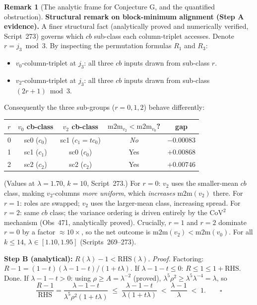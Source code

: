 \documentclass[11pt]{article}
\theoremstyle{definition}
\newtheorem{remark}[theorem]{Remark}
\begin{document}
\begin{remark}[The analytic frame for Conjecture G, and the quantified
obstruction]
\textbf{Structural remark on block-minimum alignment (Step A evidence).}
A finer structural fact (analytically proved and numerically verified, Script~273)
governs which $cb$ sub-class each column-triplet accesses.
Denote $r = j_3 \bmod 3$. By inspecting the permutation formulas $R_1$ and $R_3$:
\begin{itemize}
  \item $v_0$-column-triplet at $j_3$: all three $cb$ inputs drawn from sub-class $r$.
  \item $v_2$-column-triplet at $j_3$: all three $cb$ inputs drawn from sub-class $(2r+1)\!\bmod 3$.
\end{itemize}
Consequently the three sub-groups ($r=0,1,2$) behave differently:
\begin{center}
\begin{tabular}{ccccc}
$r$ & $v_0$ cb-class & $v_2$ cb-class & $\mathrm{m2m}_{v_2}{<}\mathrm{m2m}_{v_0}$? & gap \\
\hline
0 & sc0 ($c_0$) & sc1 ($c_1{=}tc_0$) & \emph{No} & $-0.00083$ \\
1 & sc1 ($c_1$) & sc0 ($c_0$) & Yes & $+0.00868$ \\
2 & sc2 ($c_2$) & sc2 ($c_2$) & Yes & $+0.00746$ \\
\end{tabular}
\end{center}
(Values at $\lambda=1.70$, $k=10$, Script~273.)
For $r=0$: $v_2$ uses the smaller-mean $cb$ class, making $v_2$-columns \emph{more uniform},
which \emph{increases} $\mathrm{m2m}(v_2)$ there.
For $r=1$: roles are swapped; $v_2$ uses the larger-mean class, increasing spread.
For $r=2$: same $cb$ class; the variance ordering is driven entirely by the $\mathrm{CoV}^2$
mechanism (Obs~471, analytically proved).
Crucially, $r=1$ and $r=2$ dominate $r=0$ by a factor $\approx 10\times$, so the net outcome
is $\mathrm{m2m}(v_2) < \mathrm{m2m}(v_0)$.
For all $k \le 14$, $\lambda \in [1.10, 1.95]$ (Scripts~269--273).

\textbf{Step B (analytical):} $R(\lambda) - 1 < \mathrm{RHS}(\lambda)$.
\emph{Proof.} Factoring: $R-1 = (1-t)(\lambda-1-t)/(1+t\lambda)$.
If $\lambda-1-t \le 0$: $R \le 1 \le 1+\mathrm{RHS}$. Done.
If $\lambda-1-t > 0$: using $\rho \ge A = \lambda^{-2}$ (proved),
$\lambda^5\rho^2 \ge \lambda^5\lambda^{-4} = \lambda$, so
\[
  \frac{R-1}{\mathrm{RHS}} = \frac{\lambda-1-t}{\lambda^5\rho^2(1+t\lambda)}
  \;\le\; \frac{\lambda-1-t}{\lambda(1+t\lambda)}
  \;<\; \frac{\lambda-1}{\lambda} \;<\; 1. \qquad\square
\]


\end{remark}
\end{document}
